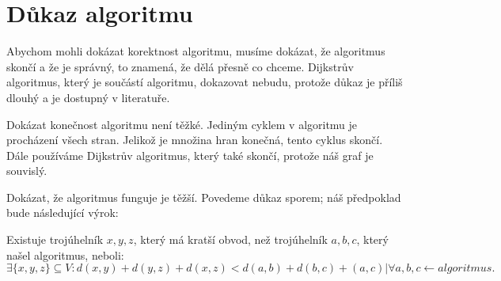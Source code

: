 \section{Důkaz algoritmu}
\label{dukaz_algoritmu}

Abychom mohli dokázat korektnost algoritmu, musíme dokázat, že algoritmus skončí a že je správný, to znamená, že dělá přesně co chceme. Dijkstrův algoritmus, který je součástí algoritmu, dokazovat nebudu, protože důkaz je příliš dlouhý a je dostupný v literatuře.

Dokázat konečnost algoritmu není těžké. Jediným cyklem v algoritmu je procházení všech stran. Jelikož je množina hran konečná, tento cyklus skončí.  Dále používáme Dijkstrův algoritmus, který také skončí, protože náš graf je souvislý. 

Dokázat, že algoritmus funguje je těžší. Povedeme důkaz sporem; náš předpoklad bude následující výrok:

\begin{vyrok}[Předpoklad]
Existuje trojúhelník $x, y, z$, který má kratší obvod, než trojúhelník $a, b, c$, který našel algoritmus, neboli:
\begin{equation*}
    \exists \{x, y, z\}\subseteq V: d(x, y) + d(y, z) + d(x, z) < d(a, b) + d(b, c) + (a, c)| \forall a, b, c \leftarrow algoritmus.
\end{equation*}
\end{vyrok}

